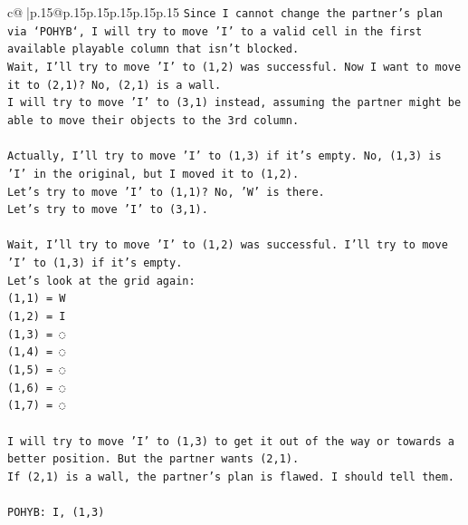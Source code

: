 \documentclass{article}
\begin{document}
{\begin{supertabular}{c@{$\;$}|p{.15\linewidth}@{}p{.15\linewidth}p{.15\linewidth}p{.15\linewidth}p{.15\linewidth}p{.15\linewidth}}
{{{\texttt{Since I cannot change the partner's plan via `POHYB`, I will try to move 'I' to a valid cell in the first available playable column that isn't blocked.} \\
\texttt{Wait, I'll try to move 'I' to (1,2) was successful. Now I want to move it to (2,1)? No, (2,1) is a wall.} \\
\texttt{I will try to move 'I' to (3,1) instead, assuming the partner might be able to move their objects to the 3rd column.} \\
\\ 
\texttt{Actually, I'll try to move 'I' to (1,3) if it's empty. No, (1,3) is 'I' in the original, but I moved it to (1,2).} \\
\texttt{Let's try to move 'I' to (1,1)? No, 'W' is there.} \\
\texttt{Let's try to move 'I' to (3,1).} \\
\\ 
\texttt{Wait, I'll try to move 'I' to (1,2) was successful. I'll try to move 'I' to (1,3) if it's empty.} \\
\texttt{Let's look at the grid again:} \\
\texttt{(1,1) = W} \\
\texttt{(1,2) = I} \\
\texttt{(1,3) = ◌} \\
\texttt{(1,4) = ◌} \\
\texttt{(1,5) = ◌} \\
\texttt{(1,6) = ◌} \\
\texttt{(1,7) = ◌} \\
\\ 
\texttt{I will try to move 'I' to (1,3) to get it out of the way or towards a better position. But the partner wants (2,1).} \\
\texttt{If (2,1) is a wall, the partner's plan is flawed. I should tell them.} \\
\\ 
\texttt{POHYB: I, (1,3)} \\
            }
        }
    }
     \\ \\


\end{supertabular}}
\end{document}

